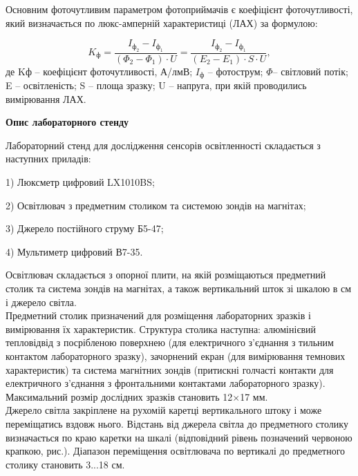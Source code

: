 \documentclass[a4paper,14pt]{extreport}
\begin{document}
Основним фоточутливим параметром фотоприймачів є коефіцієнт
фоточутливості, який визначається по люкс-амперній характеристиці (ЛАХ) за
формулою:

\begin{equation}
K_{\text{ф}}=\dfrac{I_{\text{ф}_2}-I_{\text{ф}_1}}{(\Phi_2-\Phi_1)\cdot U}=\dfrac{I_{\text{ф}_2}-I_{\text{ф}_1}}{(E_2-E_1)\cdot S\cdot U},
\end{equation}
де Kф – коефіцієнт фоточутливості, А/лмВ; $I_{\text{ф}}$ – фотострум; $\Phi$– світловий потік; E – освітленість; S – площа зразку; U – напруга, при якій проводились вимірювання ЛАХ.


\begin{center}
\textbf{Опис лабораторного стенду}
\end{center}

Лабораторний стенд для дослідження сенсорів освітленності складається з
наступних приладів:

\begin{trivlist}
\item 1) Люксметр цифровий LX1010BS;
\item 2) Освітлювач з предметним столиком та системою зондів на магнітах;
\item 3) Джерело постійного струму Б5-47;
\item 4) Мультиметр цифровий В7-35.
\end{trivlist}

Освітлювач складається з опорної плити, на якій розміщаються предметний
столик та система зондів на магнітах, а також вертикальний шток зі
шкалою в см і джерело світла.\\

Предметний столик призначений для розміщення лабораторних зразків і
вимірювання їх характеристик. Структура столика наступна:
алюмінієвий тепловідвід з посрібленою поверхнею (для електричного з’єднання з
тильним контактом лабораторного зразку), зачорнений екран (для вимірювання
темнових характеристик) та система магнітних зондів (притискні голчасті
контакти для електричного з’єднання з фронтальними контактами лабораторного
зразку). Максимальний розмір дослідних зразків становить 12$\times$17 мм.\\

Джерело світла закріплене на рухомій каретці вертикального
штоку і може переміщатись вздовж нього. Відстань від джерела світла до
предметного столику визначається по краю каретки на шкалі (відповідний рівень
позначений червоною крапкою, рис.). Діапазон переміщення освітлювача по
вертикалі до предметного столику становить 3...18 см.\\
\end{document}
